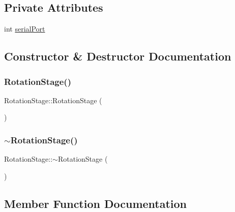 \subsection*{Private Attributes}
\begin{DoxyCompactItemize}
\item 
int \hyperlink{class_rotation_stage_a3c76fa916da6c1804f62d61e9092ec1c}{serial\+Port}
\end{DoxyCompactItemize}


\subsection{Constructor \& Destructor Documentation}
\mbox{\label{class_rotation_stage_a14ae00fd0137138b8fa3c653498d13e9}} 
\subsubsection{\texorpdfstring{Rotation\+Stage()}{RotationStage()}}
{\footnotesize\ttfamily Rotation\+Stage\+::\+Rotation\+Stage (\begin{DoxyParamCaption}{ }\end{DoxyParamCaption})\hspace{0.3cm}{\ttfamily [inline]}}

\mbox{\label{class_rotation_stage_a3023bae2d8de9f084036de453d8ac374}} 
\subsubsection{\texorpdfstring{$\sim$\+Rotation\+Stage()}{~RotationStage()}}
{\footnotesize\ttfamily Rotation\+Stage\+::$\sim$\+Rotation\+Stage (\begin{DoxyParamCaption}{ }\end{DoxyParamCaption})\hspace{0.3cm}{\ttfamily [inline]}}



\subsection{Member Function Documentation}
\mbox{\label{class_rotation_stage_a8c120bd6de719b9aee263b421850bdaf}} 
